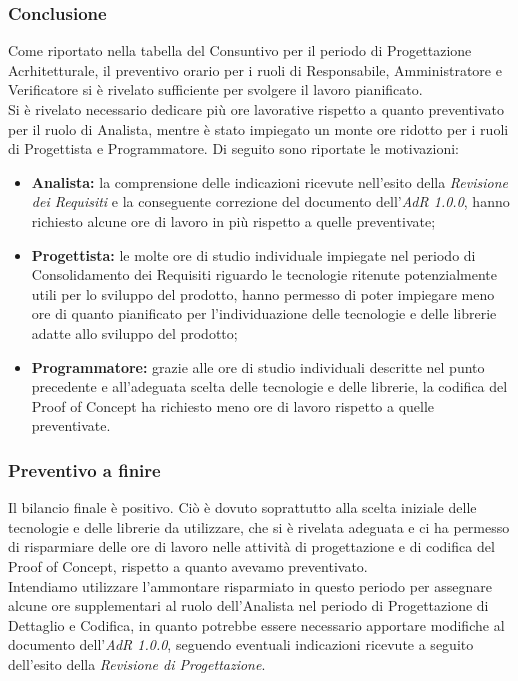 \subsubsection{Conclusione}
Come riportato nella tabella del Consuntivo per il periodo di Progettazione Acrhitetturale, il preventivo orario per i ruoli di Responsabile, Amministratore e Verificatore si è rivelato sufficiente per svolgere il lavoro pianificato. \\
Si è rivelato necessario dedicare più ore lavorative rispetto a quanto preventivato per il ruolo di Analista, mentre è stato impiegato un monte ore ridotto per i ruoli di Progettista e Programmatore. Di seguito sono riportate le motivazioni:
\begin{itemize}
	\item \textbf{Analista:} la comprensione delle indicazioni ricevute nell'esito della \textit{Revisione dei Requisiti} e la conseguente correzione del documento dell'\textit{AdR{} 1.0.0}, hanno richiesto alcune ore di lavoro in più rispetto a quelle preventivate;
	\item \textbf{Progettista:} le molte ore di studio individuale impiegate nel periodo di Consolidamento dei Requisiti riguardo le tecnologie ritenute potenzialmente utili per lo sviluppo del prodotto, hanno permesso di poter impiegare meno ore di quanto pianificato per l'individuazione delle tecnologie e delle librerie adatte allo sviluppo del prodotto;
	\item \textbf{Programmatore:} grazie alle ore di studio individuali descritte nel punto precedente e all'adeguata scelta delle tecnologie e delle librerie, la codifica del Proof of Concept ha richiesto meno ore di lavoro rispetto a quelle preventivate.
\end{itemize}
\subsubsection{Preventivo a finire}
Il bilancio finale è positivo. Ciò è dovuto soprattutto alla scelta iniziale delle tecnologie e delle librerie da utilizzare, che si è rivelata adeguata e ci ha permesso di risparmiare delle ore di lavoro nelle attività di progettazione e di codifica del Proof of Concept, rispetto a quanto avevamo preventivato. \\
Intendiamo utilizzare l'ammontare risparmiato in questo periodo per assegnare alcune ore supplementari al ruolo dell'Analista nel periodo di Progettazione di Dettaglio e Codifica, in quanto potrebbe essere necessario apportare modifiche al documento dell'\textit{AdR{} 1.0.0}, seguendo eventuali indicazioni ricevute a seguito dell'esito della \textit{Revisione di Progettazione}.


